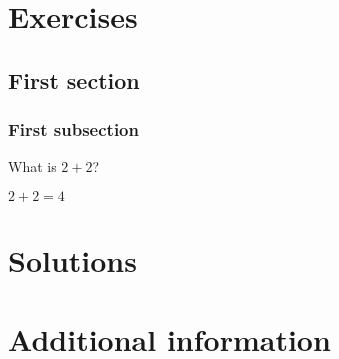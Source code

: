 \documentclass{book}
\begin{document}
\chapter{Exercises}

\section{First section}

\subsection{First subsection}

\begin{exercise}[subtitle={Simple Addition}]
  What is \(2 + 2\)?
\end{exercise}

\begin{solution}
  \(2 + 2 = 4\)
\end{solution}

\chapter{Solutions}

\chapter{Additional information}
\end{document}

